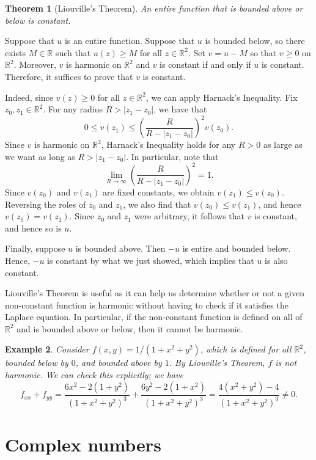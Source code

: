 \documentclass[10pt]{article}
\makeatletter
\newcommand{\R}{\mathbb{R}}
\theoremstyle{newstyle}
\newtheorem{thm}{Theorem}[section]
\newtheorem{exmp}[thm]{Example}
\newenvironment{pf}[1][\proofname]{\par
  \pushQED{\qed}%
  \normalfont \topsep0\p@\relax
  \trivlist
  \item[\hskip\labelsep\scshape
  #1\@addpunct{.}]\ignorespaces
}{%
  \popQED\endtrivlist\@endpefalse
}
\makeatother
\begin{document}
\begin{thm}[Liouville's Theorem]
An entire function that is bounded above or below is constant.
\end{thm}
\begin{pf}
Suppose that $u$ is an entire function. Suppose that 
$u$ is bounded below, so there exists $M \in \R$ such that $u(z) \geq M$ for all $z \in \R^2$. 
Set $v = u - M$ so that $v \geq 0$ on $\R^2$. Moreover, $v$ is harmonic on $\R^2$
and $v$ is constant if and only if $u$ is constant. Therefore, it suffices to 
prove that $v$ is constant. 

Indeed, since $v(z) \geq 0$ for all $z \in \R^2$, we can apply Harnack's Inequality. 
Fix $z_0, z_1 \in \R^2$. For any radius $R > |z_1 - z_0|$, we have that 
\[ 0 \leq v(z_1) \leq \left( \frac{R}{R - |z_1 - z_0|} \right)^2 v(z_0). \]
Since $v$ is harmonic on $\R^2$, Harnack's Inequality holds for any $R > 0$ as large 
as we want as long as $R > |z_1 - z_0|$. In particular, note that 
\[ \lim_{R\to\infty} \left( \frac{R}{R-|z_1 - z_0|} \right)^2 = 1. \]
Since $v(z_0)$ and $v(z_1)$ are fixed constants, we obtain
$v(z_1) \leq v(z_0)$.
Reversing the roles of $z_0$ and $z_1$, we also find that $v(z_0) \leq v(z_1)$,
and hence $v(z_0) = v(z_1)$. Since $z_0$ and $z_1$ were arbitrary, it follows that 
$v$ is constant, and hence so is $u$.

Finally, suppose $u$ is bounded above. Then $-u$ is entire and bounded below.
Hence, $-u$ is constant by what we just showed, which implies that $u$ is also constant.
\end{pf}

Liouville's Theorem is useful as it can help us determine whether or not a given 
non-constant function is harmonic without having to check if it satisfies the Laplace equation. 
In particular, if the non-constant function is defined on all of $\R^2$ and is bounded 
above or below, then it cannot be harmonic. 

\begin{exmp}
Consider $f(x, y) = 1/(1+x^2+y^2)$, which is defined for all $\R^2$, bounded below by $0$, 
and bounded above by $1$. By Liouville's Theorem, $f$ is not harmonic. We can check this explicitly; 
we have 
\[ f_{xx} + f_{yy} = \frac{6x^2 - 2(1+y^2)}{(1+x^2+y^2)^3} + \frac{6y^2 - 2(1+x^2)}{(1+x^2+y^2)^3} 
= \frac{4(x^2+y^2) - 4}{(1+x^2+y^2)^3} \neq 0. \]
\end{exmp}

\newpage
\section{Complex numbers}
\end{document}
